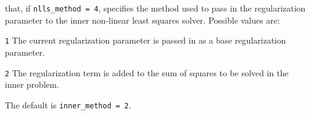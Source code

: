 \begin{description}
that, if {\tt nlls\_method = 4}, specifies the method used to pass in 
the regularization parameter to the inner non-linear least squares solver.  
Possible values are:
\begin{description}
  \item {\tt 1} The current regularization parameter is passed in as a base regularization parameter.
  \item {\tt 2} The regularization term is added to the sum of squares to be solved in the inner problem.
\end{description}
The default is {\tt inner\_method = 2}.


\end{description}


